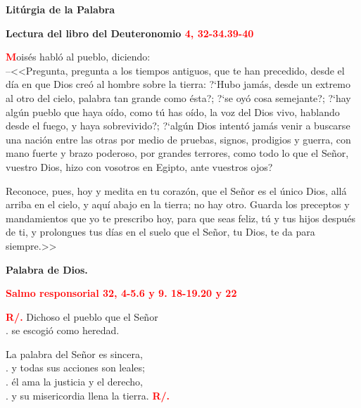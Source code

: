 \documentclass[12pt, letterpaper]{report}
\begin{document}
  \clearpage

  \begin{center}
    \Huge {\bfseries Lit\'urgia de la Palabra}
  \end{center}

  \Large {\bfseries Lectura del libro del Deuteronomio \hspace{1cm} \textcolor{red}{4, 32-34.39-40}}

  \Large \lettrine[lines=2]{\bfseries \textcolor{red}{M}}{}\Large ois\'es habl\'o al pueblo, diciendo:\\
  --<<Pregunta, pregunta a los tiempos antiguos, que te han precedido, desde el d\'ia en que Dios
  cre\'o al hombre sobre la tierra: ?`Hubo jam\'as, desde un extremo al otro del cielo, palabra tan
  grande como \'esta?; ?`se oy\'o cosa semejante?; ?`hay alg\'un pueblo que haya o\'ido, como t\'u has
  o\'ido, la voz del Dios vivo, hablando desde el fuego, y haya sobrevivido?; ?`alg\'un Dios intent\'o
  jam\'as venir a buscarse una naci\'on entre las otras por medio de pruebas, signos, prodigios y
  guerra, con mano fuerte y brazo poderoso, por grandes terrores, como todo lo que el Se\~nor, vuestro
  Dios, hizo con vosotros en Egipto, ante vuestros ojos?

  Reconoce, pues, hoy y medita en tu coraz\'on, que el Se\~nor es el \'unico Dios, all\'a arriba en el
  cielo, y aqu\'i abajo en la tierra; no hay otro. Guarda los preceptos y mandamientos que yo te
  prescribo hoy, para que seas feliz, t\'u y tus hijos despu\'es de ti, y prolongues tus d\'ias en el
  suelo que el Se\~nor, tu Dios, te da para siempre.>>

  {\bfseries Palabra de Dios.}

  \clearpage

  \Large {\bfseries \textcolor{red}{Salmo responsorial \hspace{1cm} 32, 4-5.6 y 9. 18-19.20 y 22}}

  \Large {\bfseries \textcolor{red}{R/.}} \hspace{1cm} Dichoso el pueblo que el Se\~nor\\
  . \hspace{3cm} se escogi\'o como heredad.

  \hspace{2cm} La palabra del Se\~nor es sincera,\\
  . \hspace{2.5cm} y todas sus acciones son leales;\\
  . \hspace{2.5cm} \'el ama la justicia y el derecho,\\
  . \hspace{2.5cm} y su misericordia llena la tierra. \hspace{1cm} {\bfseries \textcolor{red}{R/.}}
\end{document}
